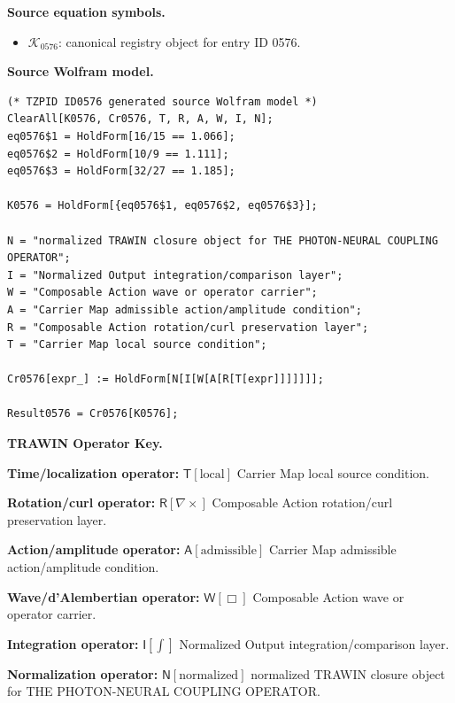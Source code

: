 \begin{minipage}[t]{0.49\linewidth}
\begingroup
\small
\raggedright
\textbf{Source equation symbols.}\par
\begin{itemize}[leftmargin=1.35em,itemsep=1pt,topsep=1pt,parsep=0pt]
    \item $\mathcal{K}_{0576}$: canonical registry object for entry ID 0576.
\end{itemize}
\endgroup
\end{minipage}\hfill
\begin{minipage}[t]{0.47\linewidth}
\begingroup
\scriptsize
\raggedright
\textbf{Source Wolfram model.}\par
\begin{Verbatim}[fontsize=\tiny,breaklines=true,breakanywhere=true]
(* TZPID ID0576 generated source Wolfram model *)
ClearAll[K0576, Cr0576, T, R, A, W, I, N];
eq0576$1 = HoldForm[16/15 == 1.066];
eq0576$2 = HoldForm[10/9 == 1.111];
eq0576$3 = HoldForm[32/27 == 1.185];

K0576 = HoldForm[{eq0576$1, eq0576$2, eq0576$3}];

N = "normalized TRAWIN closure object for THE PHOTON-NEURAL COUPLING OPERATOR";
I = "Normalized Output integration/comparison layer";
W = "Composable Action wave or operator carrier";
A = "Carrier Map admissible action/amplitude condition";
R = "Composable Action rotation/curl preservation layer";
T = "Carrier Map local source condition";

Cr0576[expr_] := HoldForm[N[I[W[A[R[T[expr]]]]]]];

Result0576 = Cr0576[K0576];
\end{Verbatim}
\endgroup
\end{minipage}

\par\vspace{0.45\baselineskip}
\noindent\begin{minipage}[t]{\linewidth}
\begingroup
\small
\raggedright
\textbf{TRAWIN Operator Key.}\par
\noindent\textbf{Time/localization operator:} $\mathsf{T}\!\left[\mathrm{local}\right]$ Carrier Map local source condition.\par
\noindent\textbf{Rotation/curl operator:} $\mathsf{R}\!\left[\nabla\times\right]$ Composable Action rotation/curl preservation layer.\par
\noindent\textbf{Action/amplitude operator:} $\mathsf{A}\!\left[\mathrm{admissible}\right]$ Carrier Map admissible action/amplitude condition.\par
\noindent\textbf{Wave/d'Alembertian operator:} $\mathsf{W}\!\left[\Box\right]$ Composable Action wave or operator carrier.\par
\noindent\textbf{Integration operator:} $\mathsf{I}\!\left[\int\right]$ Normalized Output integration/comparison layer.\par
\noindent\textbf{Normalization operator:} $\mathsf{N}\!\left[\mathrm{normalized}\right]$ normalized TRAWIN closure object for THE PHOTON-NEURAL COUPLING OPERATOR.\par
\endgroup
\end{minipage}

